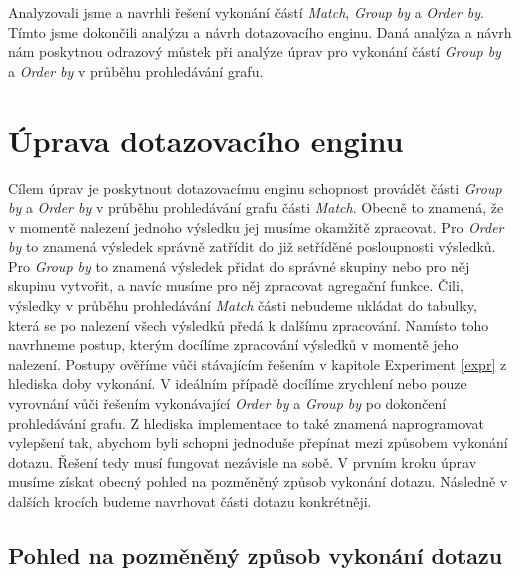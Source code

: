 \bigskip
Analyzovali jsme a navrhli řešení vykonání částí \textit{Match}, \textit{Group by} a \textit{Order by}.
Tímto jsme dokončili analýzu a návrh dotazovacího enginu.
Daná analýza a návrh nám poskytnou odrazový můstek při analýze úprav pro vykonání částí \textit{Group by} a \textit{Order by} v průběhu prohledávání grafu.


\section{Úprava dotazovacího enginu} \label{anal.improvement}

Cílem úprav je poskytnout dotazovacímu enginu schopnost provádět části \textit{Group by} a \textit{Order by} v průběhu prohledávání grafu části \textit{Match}.
Obecně to znamená, že v momentě nalezení jednoho výsledku jej musíme okamžitě zpracovat.
Pro \textit{Order by} to znamená výsledek správně zatřídit do již setříděné posloupnosti výsledků.
Pro \textit{Group by} to znamená výsledek přidat do správné skupiny nebo pro něj skupinu vytvořit, a navíc musíme pro něj zpracovat agregační funkce. 
Čili, výsledky v průběhu prohledávání \textit{Match} části nebudeme ukládat do tabulky, která se po nalezení všech výsledků předá k dalšímu zpracování.
Namísto toho navrhneme postup, kterým docílíme zpracování výsledků v momentě jeho nalezení.
Postupy ověříme vůči stávajícím řešením v kapitole Experiment \ref{expr} z hlediska doby vykonání.
V ideálním případě docílíme zrychlení nebo pouze vyrovnání vůči řešením vykonávající \textit{Order by} a \textit{Group by} po dokončení prohledávání grafu.
Z hlediska implementace to také znamená naprogramovat vylepšení tak, abychom byli schopni jednoduše přepínat mezi způsobem vykonání dotazu.
Řešení tedy musí fungovat nezávisle na sobě. 
V prvním kroku úprav musíme získat obecný pohled na pozměněný způsob vykonání dotazu.
Následně v dalších krocích budeme navrhovat části dotazu konkrétněji.

\subsection{Pohled na pozměněný způsob vykonání dotazu}

